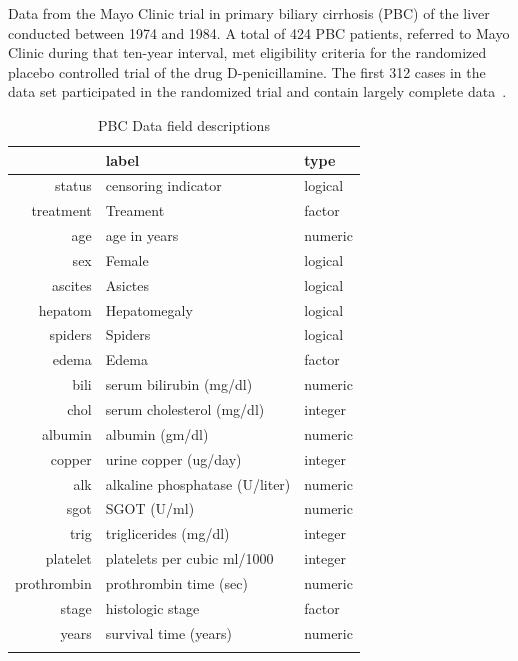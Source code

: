 \documentclass[nojss]{jss}\usepackage[]{graphicx}\usepackage[]{color}
\begin{document}
Data from the Mayo Clinic trial in primary biliary cirrhosis (PBC) of the liver conducted between 1974 and 1984. A total of 424 PBC patients, referred to Mayo Clinic during that ten-year interval, met eligibility criteria for the randomized placebo controlled trial of the drug D-penicillamine. The first 312 cases in the data set participated in the randomized trial and contain largely complete data~\citep{fleming:1991}.



\begin{table}[ht]
\centering
{\footnotesize
\begin{tabular}{rll}
  \toprule
 & label & type \\ 
  \midrule
status & censoring indicator & logical \\ 
   \rowcolor[gray]{0.95}treatment & Treament & factor \\ 
  age & age in years & numeric \\ 
   \rowcolor[gray]{0.95}sex & Female & logical \\ 
  ascites & Asictes & logical \\ 
   \rowcolor[gray]{0.95}hepatom & Hepatomegaly & logical \\ 
  spiders & Spiders & logical \\ 
   \rowcolor[gray]{0.95}edema & Edema & factor \\ 
  bili & serum bilirubin (mg/dl) & numeric \\ 
   \rowcolor[gray]{0.95}chol & serum cholesterol (mg/dl) & integer \\ 
  albumin & albumin (gm/dl) & numeric \\ 
   \rowcolor[gray]{0.95}copper & urine copper (ug/day) & integer \\ 
  alk & alkaline phosphatase (U/liter) & numeric \\ 
   \rowcolor[gray]{0.95}sgot & SGOT (U/ml) & numeric \\ 
  trig & triglicerides (mg/dl) & integer \\ 
   \rowcolor[gray]{0.95}platelet & platelets per cubic ml/1000 & integer \\ 
  prothrombin & prothrombin time (sec) & numeric \\ 
   \rowcolor[gray]{0.95}stage & histologic stage & factor \\ 
  years & survival time (years) & numeric \\ 
   \rowcolor[gray]{0.95} \bottomrule
\end{tabular}
}
\caption{PBC Data field descriptions} 
\label{T:dataLabs}
\end{table}
\end{document}

